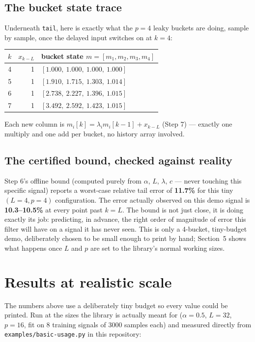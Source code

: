 \documentclass[11pt]{article}
\begin{document}
\subsection{The bucket state trace}
Underneath \texttt{tail}, here is exactly what the $p{=}4$ leaky buckets are doing, sample by sample, once the delayed input switches on at $k=4$:
\begin{center}
\small
\begin{tabular}{rrl}
\toprule
$k$ & $x_{k-L}$ & bucket state $m=[m_1,m_2,m_3,m_4]$ \\
\midrule
4 & 1 & $[1.000,\ 1.000,\ 1.000,\ 1.000]$ \\
5 & 1 & $[1.910,\ 1.715,\ 1.303,\ 1.014]$ \\
6 & 1 & $[2.738,\ 2.227,\ 1.396,\ 1.015]$ \\
7 & 1 & $[3.492,\ 2.592,\ 1.423,\ 1.015]$ \\
\bottomrule
\end{tabular}
\end{center}
Each new column is $m_i[k]=\lambda_i m_i[k-1]+x_{k-L}$ (Step 7) --- exactly one multiply and one add per bucket, no history array involved.

\subsection{The certified bound, checked against reality}
Step 6's offline bound (computed purely from $\alpha$, $L$, $\lambda$, $c$ --- never touching this specific signal) reports a worst-case relative tail error of \textbf{11.7\%} for this tiny $(L{=}4,p{=}4)$ configuration. The error actually observed on this demo signal is \textbf{10.3--10.5\%} at every point past $k=L$. The bound is not just close, it is doing exactly its job: predicting, in advance, the right order of magnitude of error this filter will have on a signal it has never seen. This is only a 4-bucket, tiny-budget demo, deliberately chosen to be small enough to print by hand; Section~5 shows what happens once $L$ and $p$ are set to the library's normal working sizes.

\section{Results at realistic scale}

The numbers above use a deliberately tiny budget so every value could be printed. Run at the sizes the library is actually meant for ($\alpha=0.5$, $L=32$, $p=16$, fit on 8 training signals of 3000 samples each) and measured directly from \texttt{examples/basic-usage.py} in this repository:
\end{document}
